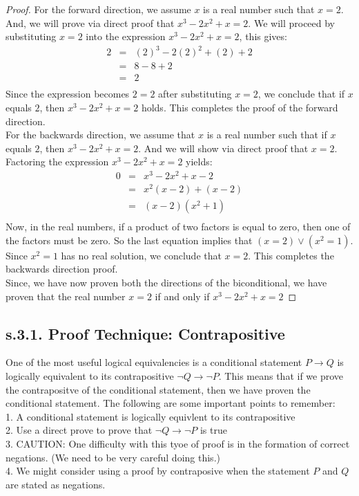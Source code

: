 \begin{example}
\begin{proof}
For the forward direction, we assume $x$ is a real number such that $x = 2$. And, we will prove via direct proof that $x^3 -2x^2 + x = 2$. We will proceed by substituting $x = 2$ into the expression $x^3 -2x^2 + x = 2$, this gives:
	\begin{eqnarray*}
		2 & = & (2)^3 -2(2)^2 + (2) + 2 \nonumber \\
		& = & 8 - 8 + 2 \nonumber \\
		& = & 2 \nonumber \\
	\end{eqnarray*}
Since the expression becomes $2 = 2$ after substituting $x = 2$, we conclude that if $x$ equals $2$, then $x^3 -2x^2 + x = 2$ holds. This completes the proof of the forward direction. \\
For the backwards direction, we assume that $x$ is a real number such that if $x$ equals $2$, then $x^3 -2x^2 + x = 2$. And we will show via direct proof that $x = 2$. Factoring the expression $x^3 -2x^2 + x = 2$ yields: 
	\begin{eqnarray*}
		0 & = & x^3 -2x^2 + x - 2 \nonumber \\
		& = & x^2(x - 2) + (x - 2) \nonumber \\
		& = & (x - 2)(x^2 + 1) \nonumber \\
	\end{eqnarray*}
Now, in the real numbers, if a product of two factors is equal to zero, then one of the factors must be zero. So the last equation implies that $ (x = 2) \vee (x^2 = 1)$. Since $x^2 = 1$ has no real solution, we conclude that $x = 2$. This completes the backwards direction  proof. \\
Since, we have now proven both the directions of the biconditional, we have proven that the real number $x = 2$ if and only if $x^3 - 2x^2 + x = 2 $
\end{proof}

\end{example}




\newpage
\subsection{s.3.1. Proof Technique: Contrapositive}
One of the most useful logical equivalencies is a conditional statement $P \to Q$ is logically equivalent to its contrapositive $\neg Q \to \neg P$. This means that if we prove the contrapositve of the conditional statement, then we have proven the conditional statement. The following are some important points to remember: \\
1. A conditional statement is logically equivlent to its contrapositive \\
2. Use a direct prove to prove that $\neg Q \to \neg P$ is true \\
3. CAUTION: One difficulty with this tyoe of proof is in the formation of correct negations. (We need to be very careful doing this.) \\
4. We might consider using a proof by contraposive when the statement $P$ and $Q$ are stated as negations. \\ 


